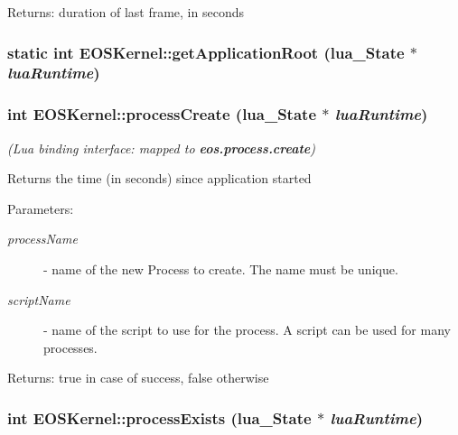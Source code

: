\begin{Desc}
\item[Returns:]duration of last frame, in seconds \end{Desc}
\hypertarget{structEOSKernel_d1ccb01e71a53c8219f0d1a8a2fa87d1}{
\subsubsection[{getApplicationRoot}]{\setlength{\rightskip}{0pt plus 5cm}static int EOSKernel::getApplicationRoot (lua\_\-State $\ast$ {\em luaRuntime})}}
\label{structEOSKernel_d1ccb01e71a53c8219f0d1a8a2fa87d1}


\hypertarget{structEOSKernel_e22b7cc7c59c6a3f40bbe3f45009b6f7}{
\subsubsection[{processCreate}]{\setlength{\rightskip}{0pt plus 5cm}int EOSKernel::processCreate (lua\_\-State $\ast$ {\em luaRuntime})}}
\label{structEOSKernel_e22b7cc7c59c6a3f40bbe3f45009b6f7}


{\em (Lua binding interface: mapped to {\bf eos.process.create})\/}\par
\par
 Returns the time (in seconds) since application started 

\begin{Desc}
\item[Parameters:]
\begin{description}
\item[{\em processName}]- name of the new Process to create. The name must be unique. \item[{\em scriptName}]- name of the script to use for the process. A script can be used for many processes. \end{description}
\end{Desc}
\begin{Desc}
\item[Returns:]true in case of success, false otherwise \end{Desc}
\hypertarget{structEOSKernel_cd45fae422857bc7341451ff8b63f0aa}{
\subsubsection[{processExists}]{\setlength{\rightskip}{0pt plus 5cm}int EOSKernel::processExists (lua\_\-State $\ast$ {\em luaRuntime})}}
\label{structEOSKernel_cd45fae422857bc7341451ff8b63f0aa}


